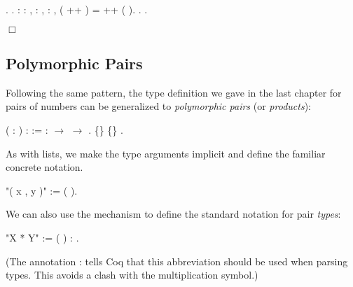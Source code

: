 \documentclass[12pt]{report}
\begin{document}
\begin{coqdoccode}
\coqdocnoindent
{}.\coqdoceol
 .\coqdoceol
\coqdocemptyline
\coqdocnoindent
{}  : \coqdockw{\ensuremath{\forall}}  : ,\coqdoceol
\coqdocindent{12.50em}
\coqdockw{\ensuremath{\forall}}   :  ,\coqdoceol
\coqdocindent{12.50em}
\coqdockw{\ensuremath{\forall}}  : ,\coqdoceol
\coqdocindent{1.00em}
 ( ++ )  =  ++ (  ).\coqdoceol
\coqdocnoindent
{}.\coqdoceol
 .\coqdoceol
\end{coqdoccode}
\ensuremath{\Box} \begin{coqdoccode}
\coqdocemptyline
\end{coqdoccode}
\subsection{Polymorphic Pairs}



 Following the same pattern, the type definition we gave in
    the last chapter for pairs of numbers can be generalized to
    \textit{polymorphic pairs} (or \textit{products}): \begin{coqdoccode}
\coqdocemptyline
\coqdocnoindent
{}  (  : ) :  :=\coqdoceol
\coqdocindent{1.00em}
 :  \ensuremath{\rightarrow}  \ensuremath{\rightarrow}   .\coqdoceol
\coqdocemptyline
\coqdocnoindent
{}  \{\} \{\} \coqdocvar{\_} \coqdocvar{\_}.\coqdoceol
\coqdocemptyline
\end{coqdoccode}
As with lists, we make the type arguments implicit and define the
    familiar concrete notation. \begin{coqdoccode}
\coqdocemptyline
\coqdocnoindent
{} "( x , y )" := (  ).\coqdoceol
\coqdocemptyline
\end{coqdoccode}
We can also use the  mechanism to define the standard
    notation for pair \textit{types}: \begin{coqdoccode}
\coqdocemptyline
\coqdocnoindent
{} "X * Y" := (  ) : .\coqdoceol
\coqdocemptyline
\end{coqdoccode}
(The annotation :  tells Coq that this abbreviation
    should be used when parsing types.  This avoids a clash with the
    multiplication symbol.) 
\end{document}
